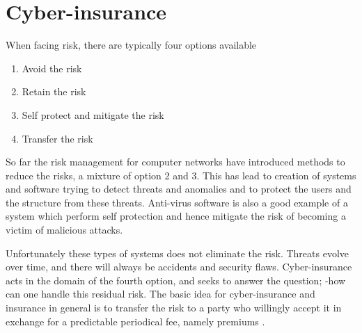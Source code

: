  \section{Cyber-insurance}
When facing risk, there are typically four options available \cite{bolot2008new}
\begin{enumerate}
\item Avoid the risk
\item Retain the risk
\item Self protect and mitigate the risk
\item Transfer the risk
\end{enumerate}
So far the risk management for computer networks have introduced methods to reduce the risks, 
a mixture of option 2 and 3. This has lead to creation of systems and software trying to detect threats and anomalies and to protect the users and the structure from these threats. Anti-virus software is also a good example of a system which perform self protection and hence mitigate the risk of becoming a victim of malicious attacks.

Unfortunately these types of systems does not eliminate the risk. Threats evolve over time, and there will always be accidents and security flaws. Cyber-insurance acts in the domain of the fourth option, and seeks to answer the question; -how can one handle this residual risk. The basic idea for cyber-insurance and insurance in general is to transfer the risk to a party who willingly accept it in exchange for a predictable periodical fee, namely premiums \cite{bolot2008cyber}. 

